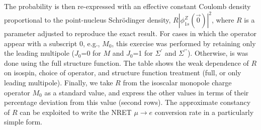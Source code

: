 \documentclass[12pt,letterpaper]{book}
\begin{document}
\begin{table}
{  The probability is then re-expressed with an effective constant Coulomb density proportional to the point-nucleus Schr\"{o}dinger density, $R |\phi_{1s}^Z(\vec{0})|^2$, where $R$ is a parameter adjusted to 
  reproduce the exact result.  For cases in which the operator appear with a subscript 0, e.g., $M_0$, this exercise was performed
  by retaining only the leading multipole ($J_0$=0 for $M$ and $J_0$=1 for $\Sigma^\prime$ and $\Sigma^{\prime \prime}$).  Otherwise, is was done using the full
  structure function.  The table shows the weak dependence of $R$ on isospin, choice of operator, and structure function treatment (full, or only leading multipole).  Finally, we take $R$
  from the isoscalar monopole charge operator $M_0$ as a standard value, and express the other values in terms of their percentage deviation from this value (second rows).   The approximate constancy
  of $R$ can be exploited to write the NRET $\mu \rightarrow e$ conversion rate in a particularly simple form.}
\end{table}
\end{document}
